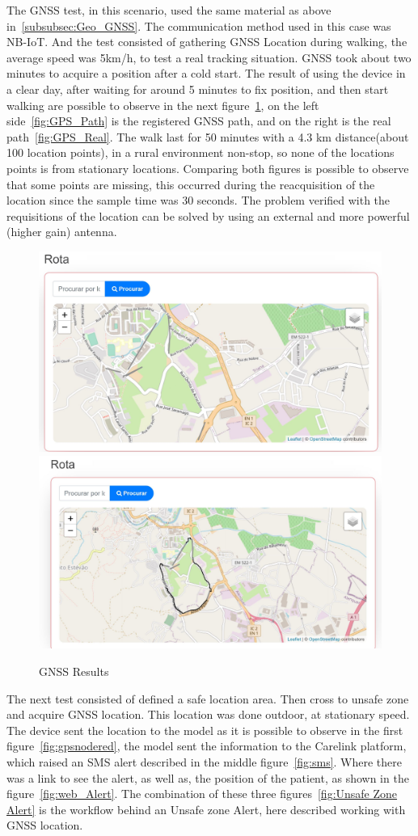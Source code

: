 The GNSS test, in this scenario, used the same material as above in~\ref{subsubsec:Geo_GNSS}. The communication method used in this case was NB-IoT. And the test consisted of gathering GNSS Location during walking, the average speed was 5km/h, to test a real tracking situation. GNSS took about two minutes to acquire a position after a cold start.
The result of using the device in a clear day, after waiting for around 5 minutes to fix position, and then start walking are possible to observe in the next figure~\ref{fig:GNSS_Results}, on the left side~\ref{fig:GPS_Path} is the registered GNSS path, and on the right is the real path~\ref{fig:GPS_Real}.  The walk last for 50 minutes with a 4.3 km distance(about 100 location points), in a rural environment non-stop, so none of the locations points is from stationary locations. Comparing both figures is possible to observe that some points are missing, this occurred during the reacquisition of the location since the sample time was 30 seconds. The problem verified with the requisitions of the location can be solved by using an external and more powerful (higher gain) antenna.
\begin{figure}[htbp]
  \centering
    {\includegraphics[width=0.5\linewidth]{Chapters/Figures/GPS.JPG}}%
    {\includegraphics[width=0.5\linewidth]{Chapters/Figures/GPSREAL.JPG}}%
  \caption{GNSS Results}
  \label{fig:GNSS_Results}
\end{figure}

The next test consisted of defined a safe location area. Then cross to unsafe zone and acquire GNSS location. This location was done outdoor, at stationary speed. The device sent the location to the model as it is possible to observe in the first figure~\ref{fig:gpsnodered}, the model sent the information to the Carelink platform, which raised an SMS alert described in the middle figure~\ref{fig:sms}. Where there was a link to see the alert, as well as, the position of the patient, as shown in the figure~\ref{fig:web_Alert}. The combination of these three figures~\ref{fig:Unsafe Zone Alert} is the workflow behind an Unsafe zone Alert, here described working with GNSS location.\newline\newline

